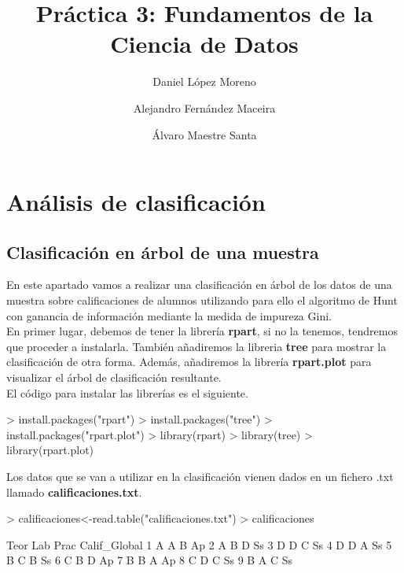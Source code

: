 \documentclass [a4paper] {article}
\title{Práctica 3: Fundamentos de la Ciencia de Datos}
\author{
  Daniel López Moreno\\
  \and
  Alejandro Fernández Maceira\\
  \and
  Álvaro Maestre Santa
}
\begin{document}
\maketitle

\section{Análisis de clasificación}

\subsection{Clasificación en árbol de una muestra}
En este apartado vamos a realizar una clasificación en árbol de los datos de una muestra sobre calificaciones
de alumnos utilizando para ello el algoritmo de Hunt con ganancia de información mediante la medida de impureza
Gini.\\
En primer lugar, debemos de tener la librería \textbf{rpart}, si no la tenemos, tendremos que proceder a 
instalarla. También añadiremos la libreria \textbf{tree} para mostrar la clasificación de otra forma. Además, añadiremos
la librería \textbf{rpart.plot} para visualizar el árbol de clasificación resultante.\\
El código para instalar las librerías es el siguiente.

\begin{Schunk}
\begin{Sinput}
> install.packages("rpart")
> install.packages("tree")
> install.packages("rpart.plot")
> library(rpart)
> library(tree)
> library(rpart.plot)
\end{Sinput}
\end{Schunk}

Los datos que se van a utilizar en la clasificación vienen dados en un fichero .txt llamado \textbf{calificaciones.txt}.

\begin{Schunk}
\begin{Sinput}
> calificaciones<-read.table("calificaciones.txt")
> calificaciones
\end{Sinput}
\begin{Soutput}
  Teor Lab Prac Calif_Global
1    A   A    B           Ap
2    A   B    D           Ss
3    D   D    C           Ss
4    D   D    A           Ss
5    B   C    B           Ss
6    C   B    D           Ap
7    B   B    A           Ap
8    C   D    C           Ss
9    B   A    C           Ss
\end{Soutput}
\end{Schunk}
\end{document}
